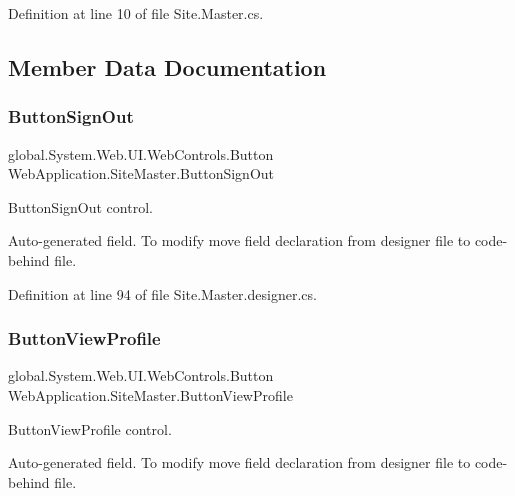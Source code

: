 Definition at line 10 of file Site.\+Master.\+cs.



\subsection{Member Data Documentation}
\mbox{\label{classWebApplication_1_1SiteMaster_aca81d110c413a44742be7fcd2c464cdc}} 
\subsubsection{\texorpdfstring{ButtonSignOut}{ButtonSignOut}}
{\footnotesize\ttfamily global.\+System.\+Web.\+U\+I.\+Web\+Controls.\+Button Web\+Application.\+Site\+Master.\+Button\+Sign\+Out\hspace{0.3cm}{\ttfamily [protected]}}



Button\+Sign\+Out control. 

Auto-\/generated field. To modify move field declaration from designer file to code-\/behind file. 

Definition at line 94 of file Site.\+Master.\+designer.\+cs.

\mbox{\label{classWebApplication_1_1SiteMaster_a0977d0b502832c397e8672dead732892}} 
\subsubsection{\texorpdfstring{ButtonViewProfile}{ButtonViewProfile}}
{\footnotesize\ttfamily global.\+System.\+Web.\+U\+I.\+Web\+Controls.\+Button Web\+Application.\+Site\+Master.\+Button\+View\+Profile\hspace{0.3cm}{\ttfamily [protected]}}



Button\+View\+Profile control. 

Auto-\/generated field. To modify move field declaration from designer file to code-\/behind file. 

